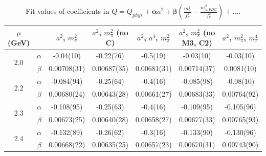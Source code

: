 \documentclass[12pt]{extarticle}
\begin{document}
\begin{table}[h!]
\begin{center}
\begin{tabular}{|c c|c|c|c|c|c|}
\hline
$\mu$ (GeV) &  & $a^2$, $m_\pi^2$& $a^2$, $m_\pi^2$ (no C)& $a^2$, $a^4$, $m_\pi^2$& $a^2$, $m_\pi^2$ (no M3, C2)& $a^2$, $m_\pi^2$, $m_\pi^4$\\
\hline
\multirow{2}{0.5in}{2.0} & $\alpha$ & -0.04(10)& -0.22(76)& -0.5(19)& -0.03(10)& -0.03(10)\\
 & $\beta$ & 0.00708(31)& 0.00687(35)& 0.00681(31)& 0.00714(37)& 0.0081(10)\\
\hline
\multirow{2}{0.5in}{2.2} & $\alpha$ & -0.084(94)& -0.25(64)& -0.4(16)& -0.085(98)& -0.08(10)\\
 & $\beta$ & 0.00680(24)& 0.00643(28)& 0.00661(27)& 0.00683(33)& 0.00764(92)\\
\hline
\multirow{2}{0.5in}{2.3} & $\alpha$ & -0.108(95)& -0.25(63)& -0.4(16)& -0.109(95)& -0.105(96)\\
 & $\beta$ & 0.00673(25)& 0.00640(28)& 0.00658(27)& 0.00677(33)& 0.00765(93)\\
\hline
\multirow{2}{0.5in}{2.4} & $\alpha$ & -0.132(89)& -0.26(62)& -0.3(16)& -0.133(90)& -0.130(96)\\
 & $\beta$ & 0.00668(22)& 0.00635(25)& 0.00657(23)& 0.00670(31)& 0.00743(90)\\
\hline
\end{tabular}
\caption{Fit values of coefficients in $Q = Q_{phys} + \mathbf{\alpha} a^2 + \mathbf{\beta}\left(\frac{m_\pi^2}{f_\pi^2}-\frac{m_{\pi,PDG}^2}{f_\pi^2}\right) + \ldots$.}
\end{center}
\end{table}




















\clearpage
\end{document}
